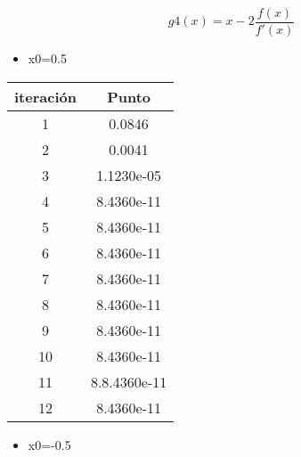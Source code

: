 \documentclass{udpreport}
\begin{document}
\begin{enumerate}
\begin{enumerate}
\begin{table}[H]
\begin{tabular} { |c|c|}
        \end{tabular}
        
    \end{table}
 \newpage
     \begin{equation}
 g4(x) = x-2\frac{f(x)}
{f'(x)}
\end{equation}
 \begin{itemize}
\item x0=0.5
\end{itemize}

\begin{table}[H]
    \centering
        \begin{tabular} { |c|c|}
        
        \hline
        iteración  &  Punto\\
        \hline
        1 &      0.0846   \\
         \hline
        2 &    0.0041    \\
         \hline
        3 &   1.1230e-05 \\
         \hline
        4 &   8.4360e-11    \\
         \hline
        5 &    8.4360e-11  \\
         \hline
        6 &   8.4360e-11     \\
         \hline
        7 & 8.4360e-11    \\
         \hline
        8 &  8.4360e-11   \\
         \hline
        9 &   8.4360e-11      \\
         \hline
        10 &   8.4360e-11      \\
         \hline
        11 & 8.8.4360e-11  \\
         \hline
        12 &  8.4360e-11      \\
        \hline
        
        \end{tabular}
        
    \end{table}
     \begin{itemize}
\item x0=-0.5
\end{itemize}

\begin{table}[H]
    \centering
        \begin{tabular} { |c|c|}
        

\end{tabular}
\end{table}
\end{enumerate}
\end{enumerate}
\end{document}
